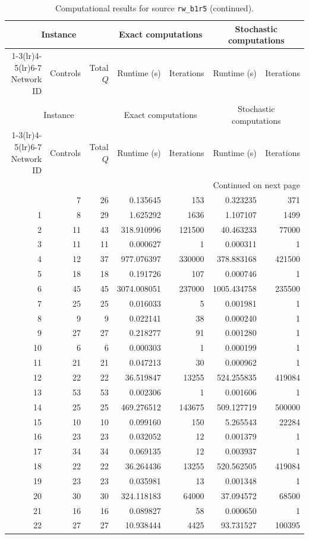 \documentclass{article}
\begin{document}
\begin{landscape}
\begin{longtable}{rrrrrrr}
\caption{Computational results for source \texttt{rw\_b1r5}.}\\
\toprule
\multicolumn{3}{c}{Instance} & \multicolumn{2}{c}{Exact computations} & \multicolumn{2}{c}{Stochastic computations} \\
\cmidrule(lr){1-3}\cmidrule(lr){4-5}\cmidrule(lr){6-7}
Network ID & Controls & Total $Q$ & Runtime (s) & Iterations & Runtime (s) & Iterations \\
\midrule
\endfirsthead
\caption[]{Computational results for source \texttt{rw\_b1r5} (continued).}\\
\toprule
\multicolumn{3}{c}{Instance} & \multicolumn{2}{c}{Exact computations} & \multicolumn{2}{c}{Stochastic computations} \\
\cmidrule(lr){1-3}\cmidrule(lr){4-5}\cmidrule(lr){6-7}
Network ID & Controls & Total $Q$ & Runtime (s) & Iterations & Runtime (s) & Iterations \\
\midrule
\endhead
\midrule
\multicolumn{7}{r}{Continued on next page} \\
\endfoot
\bottomrule
\endlastfoot
0 & 7 & 26 & 0.135645 & 153 & 0.323235 & 371 \\
1 & 8 & 29 & 1.625292 & 1636 & 1.107107 & 1499 \\
2 & 11 & 43 & 318.910996 & 121500 & 40.463233 & 77000 \\
3 & 11 & 11 & 0.000627 & 1 & 0.000311 & 1 \\
4 & 12 & 37 & 977.076397 & 330000 & 378.883168 & 421500 \\
5 & 18 & 18 & 0.191726 & 107 & 0.000746 & 1 \\
6 & 45 & 45 & 3074.008051 & 237000 & 1005.434758 & 235500 \\
7 & 25 & 25 & 0.016033 & 5 & 0.001981 & 1 \\
8 & 9 & 9 & 0.022141 & 38 & 0.000240 & 1 \\
9 & 27 & 27 & 0.218277 & 91 & 0.001280 & 1 \\
10 & 6 & 6 & 0.000303 & 1 & 0.000199 & 1 \\
11 & 21 & 21 & 0.047213 & 30 & 0.000962 & 1 \\
12 & 22 & 22 & 36.519847 & 13255 & 524.255835 & 419084 \\
13 & 53 & 53 & 0.002306 & 1 & 0.001606 & 1 \\
14 & 25 & 25 & 469.276512 & 143675 & 509.127719 & 500000 \\
15 & 10 & 10 & 0.099160 & 150 & 5.265543 & 22284 \\
16 & 23 & 23 & 0.032052 & 12 & 0.001379 & 1 \\
17 & 34 & 34 & 0.069135 & 12 & 0.003937 & 1 \\
18 & 22 & 22 & 36.264436 & 13255 & 520.562505 & 419084 \\
19 & 23 & 23 & 0.035981 & 13 & 0.001348 & 1 \\
20 & 30 & 30 & 324.118183 & 64000 & 37.094572 & 68500 \\
21 & 16 & 16 & 0.089827 & 58 & 0.000650 & 1 \\
22 & 27 & 27 & 10.938444 & 4425 & 93.731527 & 100395 \\
\end{longtable}


\end{landscape}
\end{document}
